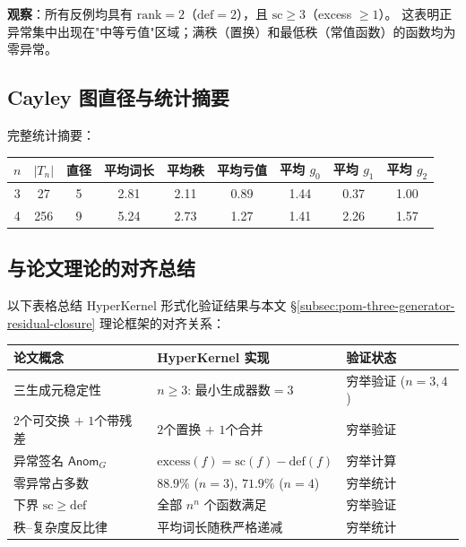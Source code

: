 \noindent
\textbf{观察}：所有反例均具有 $\mathrm{rank}=2$（$\mathrm{def}=2$），且 $\mathrm{sc}\ge 3$（excess $\ge 1$）。
这表明正异常集中出现在"中等亏值"区域；满秩（置换）和最低秩（常值函数）的函数均为零异常。

\subsection{Cayley 图直径与统计摘要}

完整统计摘要：

\begin{center}
\begin{tabular}{c|cccccccc}
\toprule
$n$ & $|T_n|$ & 直径 & 平均词长 & 平均秩 & 平均亏值 & 平均 $g_0$ & 平均 $g_1$ & 平均 $g_2$ \\
\midrule
3 & 27 & 5 & 2.81 & 2.11 & 0.89 & 1.44 & 0.37 & 1.00 \\
4 & 256 & 9 & 5.24 & 2.73 & 1.27 & 1.41 & 2.26 & 1.57 \\
\bottomrule
\end{tabular}
\end{center}

\subsection{与论文理论的对齐总结}\label{subsec:formal-alignment-summary}

以下表格总结 HyperKernel 形式化验证结果与本文 \S\ref{subsec:pom-three-generator-residual-closure} 理论框架的对齐关系：

\begin{center}
\begin{tabular}{p{5cm}|p{5cm}|p{4cm}}
\toprule
论文概念 & HyperKernel 实现 & 验证状态 \\
\midrule
三生成元稳定性 & $n\ge 3$: 最小生成器数${}=3$ & 穷举验证 ($n=3,4$) \\
$2$个可交换 $+$ $1$个带残差 & $2$个置换 $+$ $1$个合并 & 穷举验证 \\
异常签名 $\mathsf{Anom}_G$ & $\mathrm{excess}(f)=\mathrm{sc}(f)-\mathrm{def}(f)$ & 穷举计算 \\
零异常占多数 & $88.9\%$ ($n{=}3$), $71.9\%$ ($n{=}4$) & 穷举统计 \\
下界 $\mathrm{sc}\ge\mathrm{def}$ & 全部 $n^n$ 个函数满足 & 穷举验证 \\
秩–复杂度反比律 & 平均词长随秩严格递减 & 穷举统计 \\
\bottomrule
\end{tabular}
\end{center}

